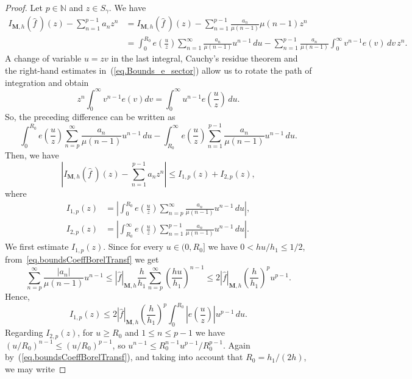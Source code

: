 \documentclass[11pt,a4paper]{article}
\theoremstyle{plain}
\theoremstyle{definition}
\numberwithin{equation}{section}
\newcommand{\N}{\mathbb{N}}
\newcommand{\M}{{\boldsymbol{M}}}
\def\ga{\gamma}
\begin{document}
\begin{proof}
Let $p\in\N$ and $z\in S_{\ga}$. We have
	\begin{align*}
		I_{\M,h}(\widehat{f}\,)(z)-\sum_{n=1}^{p-1}a_nz^n &= I_{\M,h}(\widehat{f}\,)(z)-\sum_{n=1}^{p-1}\frac{a_n}{\mu(n-1)}\mu(n-1)z^n\\
		&= \int_{0}^{R_0}e \left(\frac{u}{z}\right) \sum_{n=1}^{\infty}\frac{a_{n}}{\mu(n-1)}u^{n-1}\,du -\sum_{n=1}^{p-1}\frac{a_n}{\mu(n-1)}\int_{0}^{\infty}v^{n-1}e(v)\,dv\, z^n.
	\end{align*}
A change of variable $u=zv$ in the last integral, Cauchy's residue theorem and the right-hand estimates in~(\ref{eq.Bounds_e_sector}) allow us to rotate the path of integration and obtain
	$$
	z^n\int_{0}^{\infty}v^{n-1}e(v)dv= \int_{0}^{\infty}u^{n-1}e\left(\frac{u}{z}\right)\,du.
	$$
	So, the preceding difference can be written as
	\begin{equation*}
		\int_{0}^{R_0}e\left(\frac{u}{z}\right) \sum_{n=p}^{\infty}\frac{a_{n}}{\mu(n-1)}u^{n-1}\,du -\int_{R_0}^{\infty}e\left(\frac{u}{z}\right) \sum_{n=1}^{p-1}\frac{a_n}{\mu(n-1)}u^{n-1}\,du.
	\end{equation*}
	Then, we have
	\begin{equation}\label{eq.RemainderTwoSums}
	 \left|I_{\M,h}(\widehat{f}\,)(z)-\sum_{n=1}^{p-1}a_nz^n\right|\le I_{1,p}(z)+I_{2,p}(z),
	\end{equation}
	where
	\begin{align*}
		I_{1,p}(z)&=\left|\int_{0}^{R_0}e \left(\frac{u}{z}\right) \sum_{n=p}^{\infty}\frac{a_{n}}{\mu(n-1)}u^{n-1} \,du\right|,\\
		I_{2,p}(z)&=\left|\int_{R_0}^{\infty}e \left(\frac{u}{z}\right) \sum_{n=1}^{p-1}\frac{a_n}{\mu(n-1)}u^{n-1}\,du\right|.
	\end{align*}
	We first estimate $I_{1,p}(z)$.
	Since for every $u\in(0,R_0]$ we have $0<hu/h_1\le 1/2$, from~\eqref{eq.boundsCoeffBorelTransf} we get
	\begin{equation*}
		\sum_{n=p}^{\infty}\frac{|a_{n}|}{\mu(n-1)}u^{n-1}\le |\widehat{f}|_{\M,h} \frac{h}{h_1}\sum_{n=p}^{\infty}\left(\frac{hu}{h_1}\right)^{n-1}
	\le 2|\widehat{f}|_{\M,h}\left(\frac{h}{h_1}\right)^p u^{p-1}.
	\end{equation*}
	Hence,
\begin{equation}\label{eq.Estimates_f1}
I_{1,p}(z)\le 2|\widehat{f}|_{\M,h} \left(\frac{h}{h_1}\right)^p \int_{0}^{R_0}\left|e\left(\frac{u}{z}\right)\right| u^{p-1}\,du.
	\end{equation}
	Regarding $I_{2,p}(z)$, for $u\ge R_0$ and $1\le n\le p-1$ we have $(u/R_0)^{n-1}\le (u/R_0)^{p-1}$, so $u^{n-1}\le R_0^{n-1}u^{p-1}/R_0^{p-1}$. Again by~(\ref{eq.boundsCoeffBorelTransf}), and taking into account that $R_0=h_1/(2h)$, we may write

\end{proof}
\end{document}
